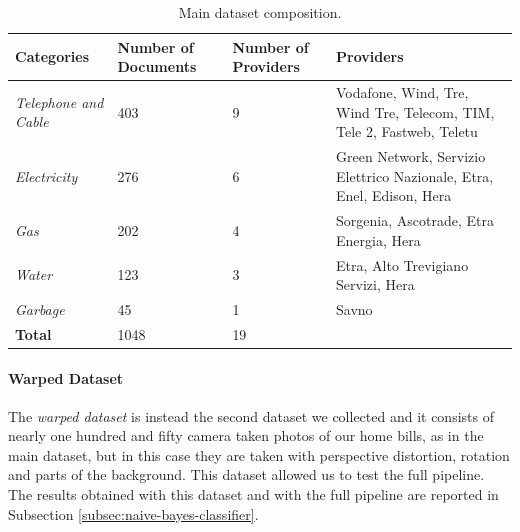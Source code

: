 \documentclass[10pt,twocolumn,letterpaper]{article}
\begin{document}
\bgroup
\def\arraystretch{1.5}%
\begin{table}[!h]
  \begin{center}
    \begin{tabular}{p{1.5cm} p{1.2cm} p{1.2cm} p{3cm}}
      \hline
      Categories                 & Number of Documents & Number of Providers & Providers                                                             \\ \hline
      \emph{Telephone and Cable} & 403                 & 9                   & Vodafone, Wind, Tre, Wind Tre, Telecom, TIM, Tele 2, Fastweb, Teletu  \\
      \emph{Electricity}         & 276                 & 6                   & Green Network, Servizio Elettrico Nazionale, Etra, Enel, Edison, Hera \\
      \emph{Gas}                 & 202                 & 4                   & Sorgenia, Ascotrade, Etra Energia, Hera                               \\
      \emph{Water}               & 123                 & 3                   & Etra, Alto Trevigiano Servizi, Hera                                   \\
      \emph{Garbage}             & 45                  & 1                   & Savno                                                                 \\ \hline
      \textbf{Total}             & 1048                & 19                  &                                                                       \\ \hline
    \end{tabular}
  \end{center}
  \label{table:main-dataset}
  \caption{Main dataset composition.}
\end{table}
\egroup

\paragraph{Warped Dataset}
\label{par:warped-dataset}

The \emph{warped dataset} is instead the second dataset we collected
and it consists of nearly one hundred and fifty camera taken photos of
our home bills, as in the main dataset, but in this case they are
taken with perspective distortion, rotation and parts of the
background. This dataset allowed us to test the full pipeline. The
results obtained with this dataset and with the full pipeline are
reported in Subsection \ref{subsec:naive-bayes-classifier}.
\end{document}
